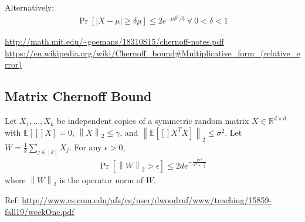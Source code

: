 \documentclass[11pt]{article}
\newcommand{\eq}[1]{\begin{align*}#1\end{align*}}
\newcommand{\norm}[1]{\left\lVert#1\right\rVert}
\newcommand{\R}{\mathbb{R}}
\newcommand{\E}[1]{\mathbb{E}[#1]}
\newcommand{\eps}{\epsilon}
\begin{document}
Alternatively:
\eq{
\Pr[|X - \mu| \geq \delta \mu] \leq 2e^{-\mu\delta^2/3} ~\forall~ 0 < \delta < 1
}

\url{http://math.mit.edu/~goemans/18310S15/chernoff-notes.pdf} \\
\url{https://en.wikipedia.org/wiki/Chernoff_bound#Multiplicative_form_(relative_error)}

\subsection{Matrix Chernoff Bound}

Let $X_1, ..., X_k$ be independent copies of a symmetric random matrix $X \in \R^{d \times d}$ with $\E[X] = 0$, $\norm{X}_2 \leq \gamma$, and $\norm{\E[X^T X]}_2 \leq \sigma^2$. Let $W = \frac{1}{k} \sum_{j \in [k]} X_j$. For any $\eps > 0$,
\eq{
	\Pr[\norm{W}_2 > \eps] \leq 2de^{-\frac{k\eps^2}{\sigma^2 + \frac{\gamma\eps}{3}}}
}
where $\norm{W}_2$ is the operator norm of $W$.

Ref: \url{http://www.cs.cmu.edu/afs/cs/user/dwoodruf/www/teaching/15859-fall19/weekOne.pdf}
\end{document}
